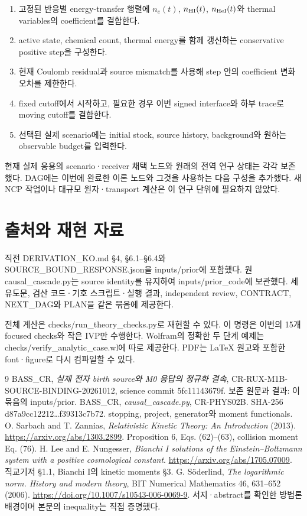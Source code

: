\documentclass[11pt,a4paper]{article}
\providecommand{\tightlist}{\setlength{\itemsep}{2pt}\setlength{\parskip}{0pt}}
\begin{document}
\begin{enumerate}
\def\labelenumi{\arabic{enumi}.}
\tightlist
\item
  고정된 반응별 energy-transfer 행렬에 \(n_e(t)\), \(n_{\rm HI}(t)\), \(n_{\rm HeI}(t)\)와 thermal variables의 coefficient를 결합한다.
\item
  active state, chemical count, thermal energy를 함께 갱신하는 conservative positive step을 구성한다.
\item
  현재 Coulomb residual과 source mismatch를 사용해 step 안의 coefficient 변화 오차를 제한한다.
\item
  fixed cutoff에서 시작하고, 필요한 경우 이번 signed interface와 하부 trace로 moving cutoff를 결합한다.
\item
  선택된 실제 scenario에는 initial stock, source history, background와 원하는 observable budget를 입력한다.
\end{enumerate}

현재 실제 응용의 scenario·receiver 채택 노드와 원래의 전역 연구 상태는 각각 보존했다. DAG에는 이번에 완료한 이론 노드와 그것을 사용하는 다음 구성을 추가했다. 새 NCP 작업이나 대규모 원자·transport 계산은 이 연구 단위에 필요하지 않았다.

\hypertarget{uxcd9cuxcc98uxc640-uxc7acuxd604-uxc790uxb8cc}{%
\section{출처와 재현 자료}\label{uxcd9cuxcc98uxc640-uxc7acuxd604-uxc790uxb8cc}}

직전 DERIVATION\_KO.md §4, §6.1--§6.4와 SOURCE\_BOUND\_RESPONSE.json을 inputs/prior에 포함했다. 원 causal\_cascade.py는 source identity를 유지하여 inputs/prior\_code에 보관했다. 세 유도문, 검산 코드·기호 스크립트·실행 결과, independent review, CONTRACT, NEXT\_DAG와 PLAN을 같은 묶음에 제공한다.

전체 계산은 checks/run\_theory\_checks.py로 재현할 수 있다. 이 명령은 이번의 15개 focused checks와 작은 IVP만 수행한다. Wolfram의 정확한 두 단계 예제는 checks/verify\_analytic\_case.wl에 따로 제공한다. PDF는 LaTeX 원고와 포함한 font·figure로 다시 컴파일할 수 있다.

\begin{thebibliography}{9}
BASS\_CR, \emph{실제 전자 birth source와 M0 응답의 정규화 결속},
CR-RUX-M1B-SOURCE-BINDING-20261012, science commit 5fc11143679f.
보존 원문과 결과: 이 묶음의 inputs/prior.
BASS\_CR, \emph{causal\_cascade.py}, CR-PHYS02B.
SHA-256 d87a9cc12212\ldots f39313c7b72.
stopping, project, generator와 moment functionals.
O. Sarbach and T. Zannias,
\emph{Relativistic Kinetic Theory: An Introduction} (2013).
\url{https://arxiv.org/abs/1303.2899}.
Proposition 6, Eqs. (62)–(63), collision moment Eq. (76).
H. Lee and E. Nungesser,
\emph{Bianchi I solutions of the Einstein--Boltzmann system with a positive cosmological constant}.
\url{https://arxiv.org/abs/1705.07009}.
직교기저 §1.1, Bianchi I의 kinetic moments §3.
G. Söderlind,
\emph{The logarithmic norm. History and modern theory},
BIT Numerical Mathematics 46, 631--652 (2006).
\url{https://doi.org/10.1007/s10543-006-0069-9}.
서지·abstract를 확인한 방법론 배경이며 본문의 inequality는 직접 증명했다.
\end{thebibliography}
\end{document}
